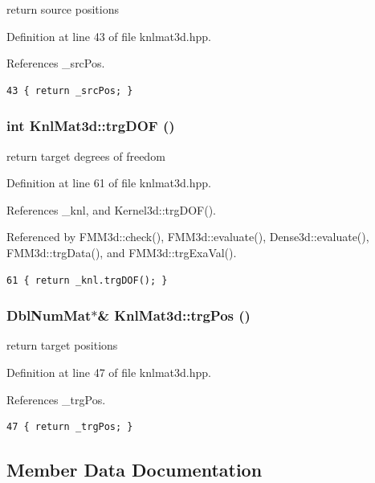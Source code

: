 return source positions 

Definition at line 43 of file knlmat3d.hpp.

References \_\-src\-Pos.

\footnotesize\begin{verbatim}43 { return _srcPos; }
\end{verbatim}\normalsize 


\subsubsection{\setlength{\rightskip}{0pt plus 5cm}int Knl\-Mat3d::trg\-DOF ()\hspace{0.3cm}{\tt  [inline]}}\label{classKnlMat3d_ea43c1f768349e86110e4e2d06e38d10_ea43c1f768349e86110e4e2d06e38d10}


return target degrees of freedom 

Definition at line 61 of file knlmat3d.hpp.

References \_\-knl, and Kernel3d::trg\-DOF().

Referenced by FMM3d::check(), FMM3d::evaluate(), Dense3d::evaluate(), FMM3d::trg\-Data(), and FMM3d::trg\-Exa\-Val().

\footnotesize\begin{verbatim}61 { return _knl.trgDOF(); }
\end{verbatim}\normalsize 


\subsubsection{\setlength{\rightskip}{0pt plus 5cm}Dbl\-Num\-Mat$\ast$\& Knl\-Mat3d::trg\-Pos ()\hspace{0.3cm}{\tt  [inline]}}\label{classKnlMat3d_7dc770563c182703b1986abb06c6dbbd_7dc770563c182703b1986abb06c6dbbd}


return target positions 

Definition at line 47 of file knlmat3d.hpp.

References \_\-trg\-Pos.

\footnotesize\begin{verbatim}47 { return _trgPos; }
\end{verbatim}\normalsize 




\subsection{Member Data Documentation}
